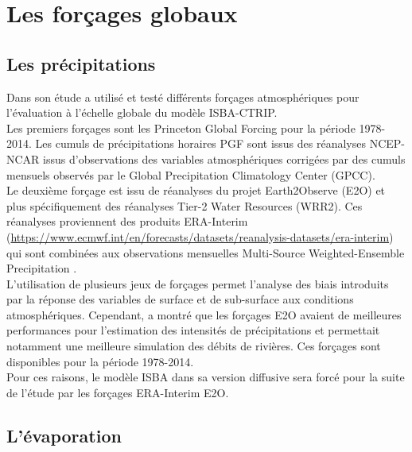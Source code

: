 \section{{\selectfont Les forçages globaux}}
\label{sec:forcing_blog}

\subsection{{\selectfont Les précipitations}}
\label{sec:e2O}
Dans son étude \citet{decharme2019} a utilisé et testé différents forçages atmosphériques pour l'évaluation à l'échelle globale du modèle ISBA-CTRIP.\\
Les premiers forçages sont les Princeton Global Forcing \citep[PGF; {\small \url{https://rda.ucar.edu/datasets/ds314.0/}}]{sheffield2006} pour la période 1978-2014. Les cumuls de précipitations horaires PGF sont issus des réanalyses NCEP-NCAR issus d'observations des variables atmosphériques corrigées par des cumuls mensuels observés par le Global Precipitation Climatology Center (GPCC).\\
Le deuxième forçage est issu de réanalyses du projet Earth2Observe (E2O) et plus spécifiquement des réanalyses Tier-2 Water Resources (WRR2). Ces réanalyses proviennent des produits ERA-Interim ({\small \url{https://www.ecmwf.int/en/forecasts/datasets/reanalysis-datasets/era-interim}}) qui sont combinées aux observations mensuelles Multi-Source Weighted-Ensemble Precipitation \citep[MSWEP,]{beck2017}.\\

L'utilisation de plusieurs jeux de forçages permet l'analyse des biais introduits par la réponse des variables de surface et de sub-surface aux conditions atmosphériques. Cependant, \citet{decharme2019} a montré que les forçages E2O avaient de meilleures performances pour l'estimation des intensités de précipitations et permettait notamment une meilleure simulation des débits de rivières. Ces forçages sont disponibles pour la période 1978-2014.\\
Pour ces raisons, le modèle ISBA dans sa version diffusive sera forcé pour la suite de l'étude par les forçages ERA-Interim E2O.

\subsection{{\selectfont L'évaporation}}
\label{sec:flake_globe}

